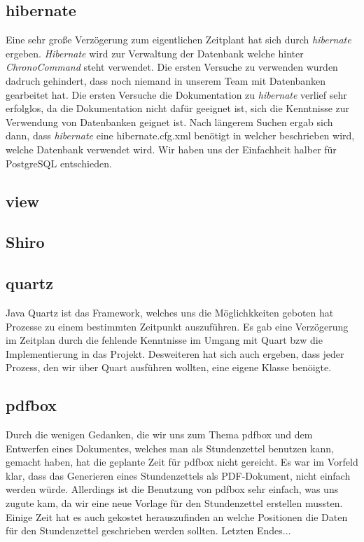 \subsection{hibernate}
Eine sehr große Verzögerung zum eigentlichen Zeitplant hat sich durch \emph{hibernate} ergeben. \emph{Hibernate} wird zur Verwaltung der
Datenbank welche hinter \emph{ChronoCommand} steht verwendet. Die ersten Versuche  zu verwenden wurden dadruch
gehindert, dass noch niemand in unserem Team mit Datenbanken gearbeitet hat. Die ersten Versuche die Dokumentation zu 
\emph{hibernate} verlief sehr erfolglos, da die Dokumentation nicht dafür geeignet ist, sich die Kenntnisse zur Verwendung von
Datenbanken geignet ist. Nach längerem Suchen ergab sich dann, dass \emph{hibernate} eine hibernate.cfg.xml benötigt in welcher 
beschrieben wird, welche Datenbank verwendet wird. Wir haben uns der Einfachheit halber für PostgreSQL entschieden. 


\subsection{view} %
\subsection{Shiro} %
\subsection{quartz} %
Java Quartz ist das Framework, welches uns die Möglichkkeiten geboten hat Prozesse zu einem bestimmten Zeitpunkt auszuführen. Es gab eine Verzögerung im Zeitplan durch die fehlende Kenntnisse im Umgang mit Quart bzw die Implementierung in das Projekt.
Desweiteren hat sich auch ergeben, dass jeder Prozess, den wir über Quart ausführen wollten, eine eigene Klasse benöigte.

\subsection{pdfbox} %
Durch die wenigen Gedanken, die wir uns zum Thema pdfbox und dem Entwerfen eines Dokumentes, welches man als Stundenzettel benutzen kann, gemacht haben, hat die geplante Zeit für pdfbox nicht gereicht. Es war im Vorfeld klar, dass das Generieren eines Stundenzettels als PDF-Dokument, nicht einfach werden würde.
Allerdings ist die Benutzung von pdfbox sehr einfach, was uns zugute kam, da wir eine neue Vorlage für den Stundenzettel erstellen mussten. Einige Zeit hat es auch gekostet herauszufinden an welche Positionen die Daten für den Stundenzettel geschrieben werden sollten.
Letzten Endes...

